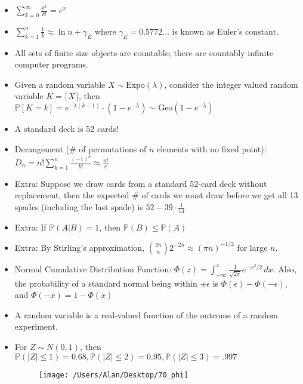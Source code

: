\documentclass{article}
\begin{document}
\begin{itemize}
	\item $\sum\limits_{k=0}^{\infty} \frac{x^k}{k!} = e^x$
	\item $\sum\limits_{k=1}^n \frac{1}{k} \approx \ln n + \gamma_E$ where $\gamma_E = 0.5772\dots$ is known as Euler’s constant.

	\item All sets of finite size objects are countable; there are countably infinite computer programs.
	\item Given a random variable $X\sim\text{Expo}(\lambda)$, consider the integer valued random variable $K = \lceil X\rceil$, then
	$\mathbb{P}[K=k] = e^{-\lambda(k-1)}\cdot(1-e^{-\lambda}) \sim\text{Geo}(1-e^{-\lambda})$

	\item A standard deck is 52 cards!
	\item Derangement (\# of permutations of $n$ elements with no fixed point): $D_n = n! \sum\limits_{k=1}^{n} \frac{(-1)^k}{k!} \approx \frac{n!}{e}$

	\item Extra: Suppose we draw cards from a standard 52-card deck without replacement, then the expected \# of cards we must draw before we get all 13 spades (including the last spade) is $52 - 39\cdot\frac{1}{14}$
	\item Extra: If $\mathbb{P}(A|B)=1$, then $\mathbb{P}(B)\leq \mathbb{P}(A)$
	\item Extra: By Stirling's approximation, $\binom{2n}{n}2^{-2n}\approx (\pi n)^{-1/2}$ for large $n$.

	\item Normal Cumulative Distribution Function: $\Phi(z) = \int_{-\infty}^z \frac{1}{\sqrt{2\pi}} e^{-x^2/2}\, dx$. Also, the probability of a standard normal being within $\pm\epsilon$ is $\Phi(\epsilon) - \Phi(-\epsilon)$, and $\Phi(-x) = 1 - \Phi(x)$
	\item A random variable is a real-valued function of the outcome of a random experiment.

	\item For $Z\sim N(0,1)$, then $\mathbb{P}(|Z|\leq 1) = 0.68, \mathbb{P}(|Z|\leq 2) = 0.95, \mathbb{P}(|Z|\leq 3) = .997$
	\begin{figure} [h!]
		\begin{center}
			\texttt{[image: /Users/Alan/Desktop/70\_phi]}
			\label{fig}
		\end{center}
	\end{figure}
\end{itemize}
\end{document}
